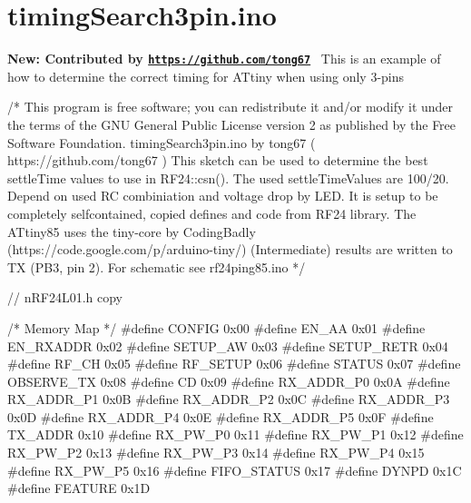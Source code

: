 \hypertarget{timingSearch3pin_8ino-example}{}\section{timing\+Search3pin.\+ino}
{\bfseries New\+: Contributed by \href{https://github.com/tong67}{\tt https\+://github.\+com/tong67}}~\newline
 This is an example of how to determine the correct timing for A\+Ttiny when using only 3-\/pins


\begin{DoxyCodeInclude}
\textcolor{comment}{/*}
\textcolor{comment}{This program is free software; you can redistribute it and/or}
\textcolor{comment}{modify it under the terms of the GNU General Public License}
\textcolor{comment}{version 2 as published by the Free Software Foundation.}
\textcolor{comment}{}
\textcolor{comment}{    timingSearch3pin.ino by tong67 ( https://github.com/tong67 )}
\textcolor{comment}{    This sketch can be used to determine the best settleTime values to use in RF24::csn().}
\textcolor{comment}{    The used settleTimeValues are 100/20. Depend on used RC combiniation and voltage drop by LED.}
\textcolor{comment}{    It is setup to be completely selfcontained, copied defines and code from RF24 library.}
\textcolor{comment}{    The ATtiny85 uses the tiny-core by CodingBadly (https://code.google.com/p/arduino-tiny/)}
\textcolor{comment}{    (Intermediate) results are written to TX (PB3, pin 2). For schematic see rf24ping85.ino }
\textcolor{comment}{*/}

\textcolor{comment}{// nRF24L01.h copy}

\textcolor{comment}{/* Memory Map */}
\textcolor{preprocessor}{#define CONFIG      0x00}
\textcolor{preprocessor}{#define EN\_AA       0x01}
\textcolor{preprocessor}{#define EN\_RXADDR   0x02}
\textcolor{preprocessor}{#define SETUP\_AW    0x03}
\textcolor{preprocessor}{#define SETUP\_RETR  0x04}
\textcolor{preprocessor}{#define RF\_CH       0x05}
\textcolor{preprocessor}{#define RF\_SETUP    0x06}
\textcolor{preprocessor}{#define STATUS      0x07}
\textcolor{preprocessor}{#define OBSERVE\_TX  0x08}
\textcolor{preprocessor}{#define CD          0x09}
\textcolor{preprocessor}{#define RX\_ADDR\_P0  0x0A}
\textcolor{preprocessor}{#define RX\_ADDR\_P1  0x0B}
\textcolor{preprocessor}{#define RX\_ADDR\_P2  0x0C}
\textcolor{preprocessor}{#define RX\_ADDR\_P3  0x0D}
\textcolor{preprocessor}{#define RX\_ADDR\_P4  0x0E}
\textcolor{preprocessor}{#define RX\_ADDR\_P5  0x0F}
\textcolor{preprocessor}{#define TX\_ADDR     0x10}
\textcolor{preprocessor}{#define RX\_PW\_P0    0x11}
\textcolor{preprocessor}{#define RX\_PW\_P1    0x12}
\textcolor{preprocessor}{#define RX\_PW\_P2    0x13}
\textcolor{preprocessor}{#define RX\_PW\_P3    0x14}
\textcolor{preprocessor}{#define RX\_PW\_P4    0x15}
\textcolor{preprocessor}{#define RX\_PW\_P5    0x16}
\textcolor{preprocessor}{#define FIFO\_STATUS 0x17}
\textcolor{preprocessor}{#define DYNPD       0x1C}
\textcolor{preprocessor}{#define FEATURE     0x1D}


\end{DoxyCodeInclude}
